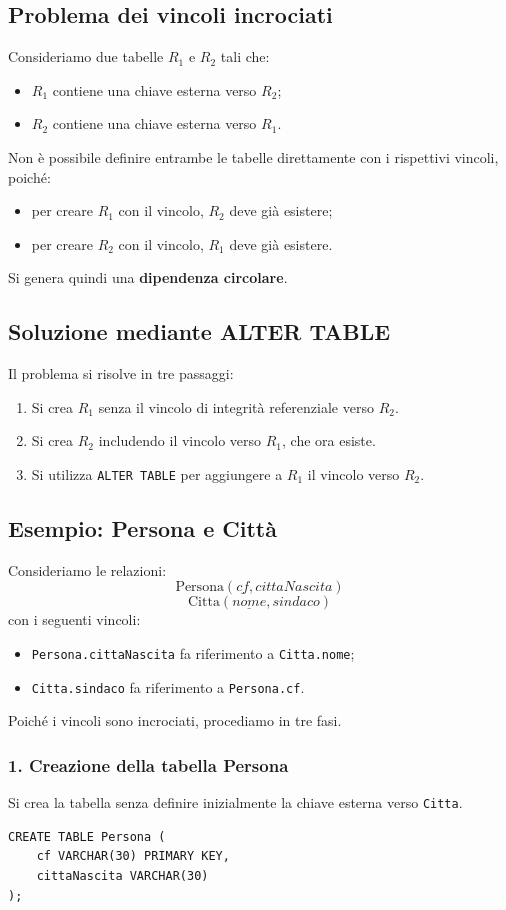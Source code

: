 \subsection{Problema dei vincoli incrociati}
Consideriamo due tabelle $R_1$ e $R_2$ tali che:
\begin{itemize}
    \item $R_1$ contiene una chiave esterna verso $R_2$;
    \item $R_2$ contiene una chiave esterna verso $R_1$.
\end{itemize}
Non è possibile definire entrambe le tabelle direttamente con i rispettivi vincoli, poiché:
\begin{itemize}
    \item per creare $R_1$ con il vincolo, $R_2$ deve già esistere;
    \item per creare $R_2$ con il vincolo, $R_1$ deve già esistere.
\end{itemize}
Si genera quindi una \textbf{dipendenza circolare}.
\subsection{Soluzione mediante ALTER TABLE}
Il problema si risolve in tre passaggi:
\begin{enumerate}
    \item Si crea $R_1$ senza il vincolo di integrità referenziale verso $R_2$.
    \item Si crea $R_2$ includendo il vincolo verso $R_1$, che ora esiste.
    \item Si utilizza \texttt{ALTER TABLE} per aggiungere a $R_1$ il vincolo verso $R_2$.
\end{enumerate}
\subsection{Esempio: Persona e Città}
Consideriamo le relazioni:
\[
\text{Persona}(\underline{cf},cittaNascita)
\]
\[
\text{Citta}(\underline{nome},sindaco)
\]
con i seguenti vincoli:
\begin{itemize}
    \item \texttt{Persona.cittaNascita} fa riferimento a \texttt{Citta.nome};
    \item \texttt{Citta.sindaco} fa riferimento a \texttt{Persona.cf}.
\end{itemize}
Poiché i vincoli sono incrociati, procediamo in tre fasi.
\subsubsection*{1. Creazione della tabella Persona}
Si crea la tabella senza definire inizialmente la chiave esterna verso \texttt{Citta}.
\begin{verbatim}
CREATE TABLE Persona (
    cf VARCHAR(30) PRIMARY KEY,
    cittaNascita VARCHAR(30)
);
\end{verbatim}
